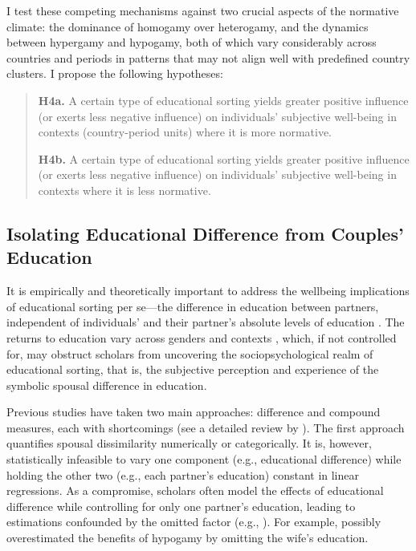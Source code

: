 I test these competing mechanisms against two crucial aspects of the normative climate: the dominance of homogamy over heterogamy, and the dynamics between hypergamy and hypogamy, both of which vary considerably across countries and periods in patterns that may not align well with predefined country clusters. I propose the following hypotheses:

\begin{quote}
    \textbf{H4a.} A certain type of educational sorting yields greater positive influence (or exerts less negative influence) on individuals' subjective well-being in contexts (country-period units) where it is more normative.

    \textbf{H4b.} A certain type of educational sorting yields greater positive influence (or exerts less negative influence) on individuals' subjective well-being in contexts where it is less normative.
\end{quote}

\subsection{Isolating Educational Difference from Couples' Education}

It is empirically and theoretically important to address the wellbeing implications of educational sorting per se—the difference in education between partners, independent of individuals' and their partner's absolute levels of education \parencite{eeckhautAnalysingEffectEducational2013,eeckhautEducationalHeterogamyDivision2014}. The returns to education vary across genders and contexts \parencite{horieReturnsSchoolingEuropean2023}, which, if not controlled for, may obstruct scholars from uncovering the sociopsychological realm of educational sorting, that is, the subjective perception and experience of the symbolic spousal difference in education.

Previous studies have taken two main approaches: difference and compound measures, each with shortcomings (see a detailed review by \cite{eeckhautAnalysingEffectEducational2013}). The first approach quantifies spousal dissimilarity numerically or categorically. It is, however, statistically infeasible to vary one component (e.g., educational difference) while holding the other two (e.g., each partner's education) constant in linear regressions. As a compromise, scholars often model the effects of educational difference while controlling for only one partner's education, leading to estimations confounded by the omitted factor (e.g., \cite{gongDoesStatusInconsistency2007,tynesEducationalHeterogamyMarital1990}). For example, \textcite{gongDoesStatusInconsistency2007} possibly overestimated the benefits of hypogamy by omitting the wife's education.

